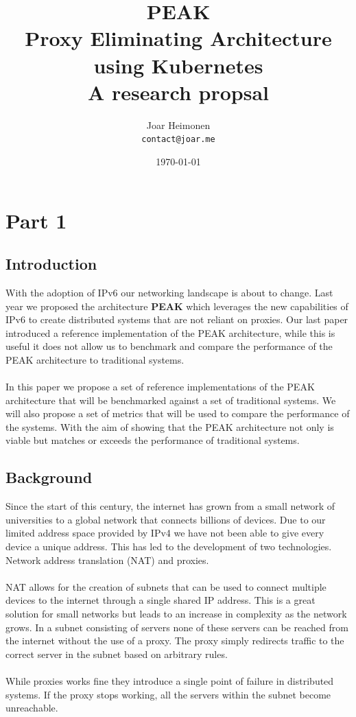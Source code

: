 \documentclass[12pt]{article}
\author{
    Joar Heimonen\\
    \texttt{contact@joar.me}
}
\title{
    \textbf{PEAK}\\[0.5em]
    \large \textbf{P}roxy \textbf{E}liminating \textbf{A}rchitecture using \textbf{K}ubernetes\\[0.3em]
    \large A research propsal
}
\date{\today}
\begin{document}
\maketitle

\pagebreak

\tableofcontents

\pagebreak


\section{Part 1}
\subsection{Introduction}
With the adoption of IPv6 \cite{hindenInternetProtocolVersion1998a} our networking landscape is about to change. Last year we proposed the architecture \textbf{PEAK} \cite{heimonenPreprintPEAKProxy} which leverages the new capabilities of IPv6
to create distributed systems that are not reliant on proxies.
Our last paper introduced a reference implementation of the PEAK architecture, while this is useful it does not allow us to benchmark and compare the performance of 
the PEAK architecture to traditional systems.
\\
\\
In this paper we propose a set of reference implementations of the PEAK architecture that will be benchmarked against a set of traditional systems.
We will also propose a set of metrics that will be used to compare the performance of the systems.
With the aim of showing that the PEAK architecture not only is viable but matches or exceeds the performance of traditional systems.

\subsection{Background}
Since the start of this century, the internet has grown from a small network of universities to a global network that connects billions of devices. Due to our limited
address space provided by IPv4 \cite{InternetProtocol1981} we have not been able to give every device a unique address. This has led to the development of two technologies. Network address translation (NAT) \cite{holdregeIPNetworkAddress1999} and proxies.
\\
\\
NAT allows for the creation of subnets that can be used to connect multiple devices to the internet through a single shared IP address. This is a great solution for small networks
but leads to an increase in complexity as the network grows. In a subnet consisting of servers none of these servers can be reached from the internet without the use of a proxy.
The proxy simply redirects traffic to the correct server in the subnet based on arbitrary rules.
\\
\\
While proxies works fine they introduce a single point of failure in distributed systems. If the proxy stops working, all the servers within the subnet become unreachable.
\end{document}
